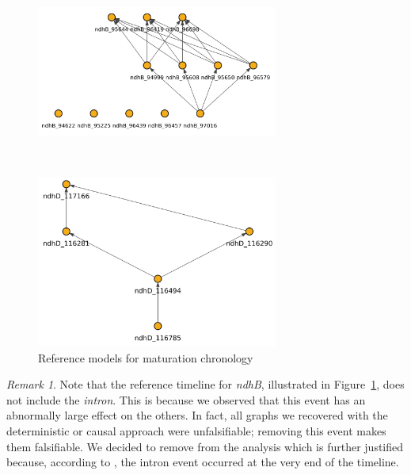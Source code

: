 \documentclass[
]{article}
\theoremstyle{definition}
\theoremstyle{remark}
\newtheorem{refremark}{Remark}[section]
\begin{document}
\begin{figure}[H]

\begin{minipage}{0.43\linewidth}

\includegraphics[width=3.125in,height=\textheight,keepaspectratio]{Figures Reference Graphs/chron_ndhB_Fig6_without_intron.png}

\end{minipage}%
%
\begin{minipage}{0.13\linewidth}
~\end{minipage}%
%
\begin{minipage}{0.43\linewidth}

\includegraphics[width=3.125in,height=\textheight,keepaspectratio]{Figures Reference Graphs/chron_ndhD_Fig6.png}

\end{minipage}%

\caption{\label{fig-ref_chrons}Reference models for maturation
chronology}

\end{figure}%

\begin{refremark}
Note that the reference timeline for \emph{ndhB}, illustrated in
Figure~\ref{fig-ref_chrons}, does not include the \emph{intron}. This is
because we observed that this event has an abnormally large effect on
the others. In fact, all graphs we recovered with the deterministic or
causal approach were unfalsifiable; removing this event makes them
falsifiable. We decided to remove from the analysis which is further
justified because, according to
, the intron event
occurred at the very end of the timeline.

\label{rem-intron}

\end{refremark}
\end{document}
